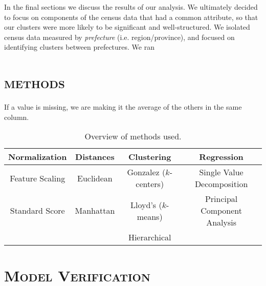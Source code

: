 \documentclass[a4paper, 11pt]{article} %
\begin{document}
In the final sections we discuss the results of our analysis. We ultimately decided to focus on components of the census data that had a common attribute, so that our clusters were more likely to be significant and well-structured. We isolated census data measured by \textit{prefecture} (i.e. region/province), and focused on identifying clusters between prefectures. We ran 



\section{\textsc{methods}}

If a value is missing, we are making it the average of the others in the same column.

\begin{table}[H]
\centering
\begin{tabular}{|c|c|c|c|}
\hline
\textbf{Normalization} & \textbf{Distances} & \textbf{Clustering}    & \textbf{Regression}          \\ \hline\hline
Feature Scaling        & Euclidean          & Gonzalez ($k$-centers) & Single Value Decomposition   \\ \hline
Standard Score         & Manhattan          & Lloyd's ($k$-means)    & Principal Component Analysis \\ \hline
~                & ~           & Hierarchical           & ~                       \\ \hline
\end{tabular}
\caption{Overview of methods used.}
\label{my-label}
\end{table}
\section{\textsc{Model Verification}}
\end{document}
